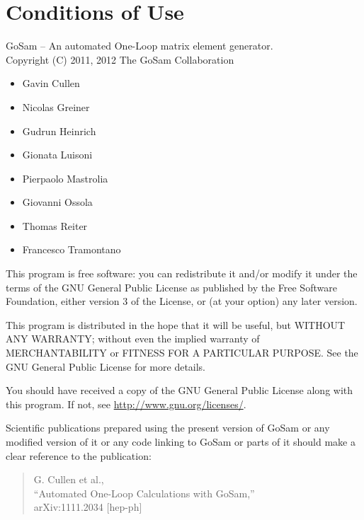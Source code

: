 \documentclass[11pt,a4paper]{refrep}
\begin{document}
\begin{fullpage}

%
\end{fullpage}

\chapter*{Conditions of Use}
    GoSam -- An automated One-Loop matrix element generator.\\
    Copyright (C) 2011, 2012  The GoSam Collaboration\\
    \begin{itemize}               
                \item Gavin Cullen
                \item Nicolas Greiner
                \item Gudrun Heinrich
                \item Gionata Luisoni
                \item Pierpaolo Mastrolia
                \item Giovanni Ossola
                \item Thomas Reiter
                \item Francesco Tramontano
    \end{itemize}

    This program is free software: you can redistribute it and/or modify
    it under the terms of the GNU General Public License as published by
    the Free Software Foundation, either version 3 of the License, or
    (at your option) any later version.

    This program is distributed in the hope that it will be useful,
    but WITHOUT ANY WARRANTY; without even the implied warranty of
    MERCHANTABILITY or FITNESS FOR A PARTICULAR PURPOSE.  See the
    GNU General Public License for more details.

    You should have received a copy of the GNU General Public License
    along with this program.  If not, see \url{http://www.gnu.org/licenses/}.

    Scientific publications prepared using the present version of
    GoSam or any modified version of it or any code linking to
    GoSam or parts of it should make a clear reference to the publication:

    \begin{quote}
        G. Cullen et al.,\\
        ``Automated One-Loop Calculations with GoSam,''\\
        arXiv:1111.2034 [hep-ph]\\
    \end{quote}
\end{document}
